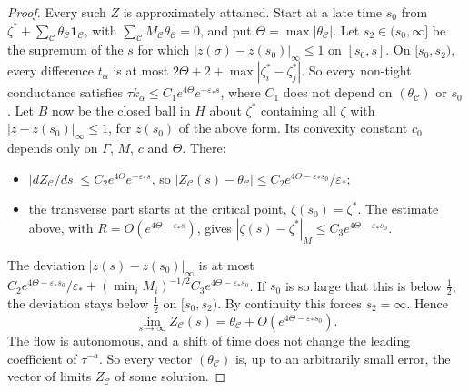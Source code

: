 \begin{proof}
Every such $Z$ is approximately attained. Start at a late time $s_0$ from
$\zeta^*+\sum_{\mathcal C}\theta_{\mathcal C}\mathbf 1_{\mathcal C}$, with
$\sum_{\mathcal C}M_{\mathcal C}\theta_{\mathcal C}=0$, and put $\Theta=\max|\theta_{\mathcal C}|$.
Let $s_2\in(s_0,\infty]$ be the supremum of the $s$ for which
$|z(\sigma)-z(s_0)|_\infty\le1$ on $[s_0,s]$. On $[s_0,s_2)$, every
difference $t_\alpha$ is at most $2\Theta+2+\max|\zeta^*_i-\zeta^*_j|$. So every
non-tight conductance satisfies $\tau k_\alpha\le C_1e^{4\Theta}e^{-\varepsilon_*s}$,
where $C_1$ does not depend on $(\theta_{\mathcal C})$ or $s_0$. Let $B$ now
be the closed ball in $H$ about $\zeta^*$ containing all $\zeta$ with
$|z-z(s_0)|_\infty\le1$, for $z(s_0)$ of the above form. Its convexity
constant $c_0$ depends only on $\Gamma$, $M$, $c$ and $\Theta$. There:
\begin{itemize}
\item $|dZ_{\mathcal C}/ds|\le C_2e^{4\Theta}e^{-\varepsilon_*s}$, so
 $|Z_{\mathcal C}(s)-\theta_{\mathcal C}|\le C_2e^{4\Theta-\varepsilon_*s_0}/\varepsilon_*$;
\item the transverse part starts at the critical point, $\zeta(s_0)=\zeta^*$.
 The estimate above, with $R=O(e^{4\Theta-\varepsilon_*s})$, gives
 $|\zeta(s)-\zeta^*|_M\le C_3e^{4\Theta-\varepsilon_*s_0}$.
\end{itemize}
The deviation $|z(s)-z(s_0)|_\infty$ is at most
$C_2e^{4\Theta-\varepsilon_*s_0}/\varepsilon_*
+(\min_iM_i)^{-1/2}C_3e^{4\Theta-\varepsilon_*s_0}$. If $s_0$ is so large
that this is below $\frac12$, the deviation stays below $\frac12$ on
$[s_0,s_2)$. By continuity this
forces $s_2=\infty$. Hence
\[
 \lim_{s\to\infty}Z_{\mathcal C}(s)=\theta_{\mathcal C}+O(e^{4\Theta-\varepsilon_*s_0}).
\]
The flow is autonomous, and a shift of time does not change the leading
coefficient of $\tau^{-a}$. So every vector $(\theta_{\mathcal C})$ is, up to an
arbitrarily small error, the vector of limits $Z_{\mathcal C}$ of some
solution.
\end{proof}
